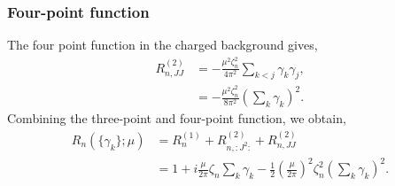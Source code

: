 \documentclass[11pt]{article}
\newcommand{\lb}{\left(}
\newcommand{\rb}{\right)}
\begin{document}
\subsubsection{Four-point function}
The four point function in the charged background gives,
\begin{align}
    R_{n,JJ}^{(2)} &= -\frac{\mu^2\zeta_n^2} {4\pi^2}\sum_{k<j}\gamma_k\gamma_j,\\
    &= -\frac{\mu^2\zeta_n^2}{8\pi^2}\lb\sum_k \gamma_k\rb^2.
\end{align}
Combining the three-point and four-point function, we obtain,
\begin{align}
    R_n(\{\gamma_k\};\mu) &= R_n^{(1)}+ R_{n,:J^2:}^{(2)}+  R_{n,JJ}^{(2)} \\&= 1+ i\frac{\mu}{2\pi}\zeta_n \sum_k\gamma_k - \frac{1}{2}\lb \frac{\mu}{2\pi}\rb^2 \zeta_n^2 \lb\sum_k\gamma_k\rb^2.
\end{align}
\end{document}
